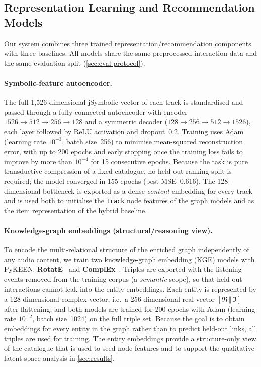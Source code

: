 \subsection{Representation Learning and Recommendation Models}

Our system combines three trained representation/recommendation components
with three baselines. All models share the same preprocessed interaction data
and the same evaluation split (\cref{sec:eval-protocol}).

\paragraph{Symbolic-feature autoencoder.}
The full 1{,}526-dimensional jSymbolic vector of each track is standardised and
passed through a fully connected autoencoder with encoder
$1526\!\rightarrow\!512\!\rightarrow\!256\!\rightarrow\!128$ and a symmetric
decoder ($128\!\rightarrow\!256\!\rightarrow\!512\!\rightarrow\!1526$), each
layer followed by ReLU activation and dropout~0.2. Training uses Adam
(learning rate $10^{-3}$, batch size~256) to minimise mean-squared
reconstruction error, with up to 200 epochs and early stopping once the
training loss fails to improve by more than $10^{-4}$ for 15 consecutive
epochs. Because the task is pure transductive compression of a fixed catalogue,
no held-out ranking split is required; the model converged in 155 epochs
(best MSE~0.616). The 128-dimensional bottleneck is exported as a dense
\emph{content} embedding for every track and is used both to initialise the
\texttt{track} node features of the graph models and as the item representation
of the hybrid baseline.

\paragraph{Knowledge-graph embeddings (structural/reasoning view).}
To encode the multi-relational structure of the enriched graph independently of
any audio content, we train two knowledge-graph embedding (KGE) models with
PyKEEN: \textbf{RotatE}~\cite{Alpher02} and \textbf{ComplEx}~\cite{Alpher03}.
 Triples are exported with the listening events removed from
the training corpus (a \emph{semantic} scope), so that held-out interactions
cannot leak into the entity embeddings. Each entity is represented by a
128-dimensional complex vector, i.e.\ a 256-dimensional real vector
$[\Re\,\Vert\,\Im]$ after flattening, and both models are trained for 200
epochs with Adam (learning rate $10^{-2}$, batch size~1024) on the full triple
set. Because the goal is to obtain embeddings for every entity in the graph
rather than to predict held-out links, all triples are used for training. The
entity embeddings provide a structure-only view of the catalogue that is used
to seed node features and to support the qualitative latent-space analysis in
\cref{sec:results}.

